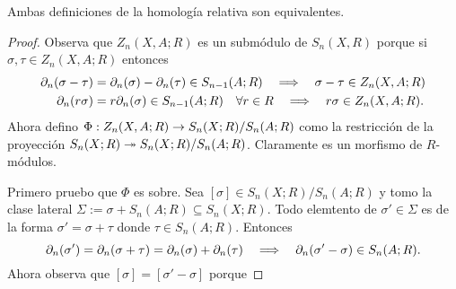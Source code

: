 \begin{ejercicio}\label{ej:64}
  Ambas definiciones de la homolog\'ia relativa son equivalentes.
\end{ejercicio}
\begin{proof}%
  Observa que $Z_n(X,A;R)$ es un subm\'odulo de $S_n(X,R)$ porque si $\sigma,\tau\in Z_n(X,A;R)$ entonces
  \begin{align*}
    \partial_n(\sigma-\tau)&=\partial_n(\sigma)-\partial_n(\tau)\in S_{n-1}(A;R)
    \quad\Longrightarrow\quad \sigma-\tau\in Z_n(X,A;R)\\
    \partial_n(r\sigma)&= r\partial_n(\sigma)\in S_{n-1}(A;R)\quad\forall r\in R \quad\Longrightarrow\quad r\sigma\in Z_n(X,A;R).
  \end{align*}
  Ahora defino $\Phi:Z_n(X,A;R)\rightarrow S_n(X;R)/S_n(A;R)$ como la restricci\'on de la proyecci\'on $S_n(X;R)\twoheadrightarrow S_n(X;R)/S_n(A;R)$.
  Claramente es un morfismo de $R$-m\'odulos.
  
  Primero pruebo que $\Phi$ es sobre. Sea $[\sigma]\in S_n(X;R)/S_n(A;R)$ y tomo la clase lateral
  $\Sigma:=\sigma+S_n(A;R)\subseteq S_n(X;R)$. Todo elemtento de $\sigma'\in\Sigma$ es de la forma $\sigma'=\sigma+\tau$ donde
  $\tau\in S_n(A;R)$. Entonces
  \[
    \partial_n(\sigma')=\partial_n(\sigma+\tau)=\partial_n(\sigma)+\partial_n(\tau) \quad\Longrightarrow\quad
    \partial_n(\sigma'-\sigma)\in S_n(A;R).
  \]
  Ahora observa que $[\sigma]=[\sigma'-\sigma]$ porque
\end{proof}%

